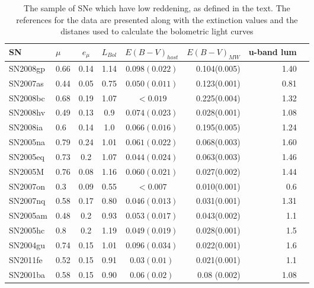 \begin{table*}
\caption{The sample of SNe which have low reddening, as defined in the text. The references for the data are presented along with the extinction values and the distanes used to calculate the bolometric light curves  }

\begin{center}
\begin{tabular}{llcccrrr}
\hline
SN  & $\mu$ & $e_{\mu}$ & $L_{Bol}$ & $E(B-V)_{host}$ & $E(B-V)_{MW}$ & u-band lum \\
\hline
SN2008gp	&	0.66	&	0.14	&	1.14	&	$0.098(0.022)$	&	0.104(0.005)	& 1.40	\\
SN2007as	&	0.44	&	0.05	&	0.75	&	$0.050(0.011)$	&	0.123(0.001)	& 0.81	\\
SN2008bc	&	0.68	&	0.19	&	1.07	&	$<0.019$	&	0.225(0.004)	& 1.32	\\
SN2008hv	&	0.49	&	0.13	&	0.9	&	$0.074(0.023)$	&	0.028(0.001)	& 1.08	\\
SN2008ia	&	0.6	&	0.14	&	1.0	&	$0.066(0.016)$	&	0.195(0.005)	& 1.24	\\
SN2005na	&	0.79	&	0.24	&	1.01	&	$0.061(0.022)$	&	0.068(0.003)	& 1.60	\\
SN2005eq	&	0.73	&	0.2	&	1.07	&	$0.044(0.024)$	&	0.063(0.003)	& 1.46	\\
SN2005M		&	0.76	&	0.08	&	1.16	&	$0.060(0.021)$	&	0.027(0.002)	& 1.44	\\
SN2007on	&	0.3	&	0.09	&	0.55	&	$<0.007$	&	0.010(0.001)	& 0.6	\\
SN2007nq	&	0.58	&	0.17	&	0.80	&	$0.046(0.013)$	&	0.031(0.001)	& 1.31	\\
SN2005am	&	0.48	&	0.2	&	0.93	&	$0.053(0.017)$	&	0.043(0.002)	& 1.1	\\
SN2005hc	&	0.8	&	0.2	&	1.19	&	$0.049(0.019)$	&	0.028(0.001)	& 1.5	\\
SN2004gu	&	0.74	&	0.15	&	1.01	&	$0.096(0.034)$	&	0.022(0.001)	& 1.6	\\
SN2011fe	&	0.52	&	0.15	&	0.91	&	$0.03 (0.01)$	&	0.021(0.001)	& 1.1	\\
SN2001ba	&	0.58	&	0.15	&	0.90	&	$ 0.06 (0.02)$  &     0.08 (0.002)	& 1.08	\\

\end{tabular}
\end{center}
\end{table*}
